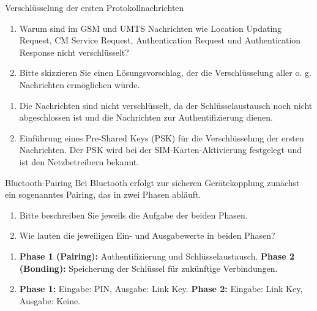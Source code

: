 \documentclass{article}
\begin{document}
\begin{exercise}{Verschlüsselung der ersten Protokollnachrichten}
  \begin{enumerate}
    \item Warum sind im GSM und UMTS Nachrichten wie Location Updating Request, CM Service Request, Authentication Request und Authentication Response nicht verschlüsselt?
    \item Bitte skizzieren Sie einen Lösungsvorschlag, der die Verschlüsselung aller o. g. Nachrichten ermöglichen würde.
  \end{enumerate}
 
   \begin{solution}
     \begin{enumerate}
      \item Die Nachrichten sind nicht verschlüsselt, da der Schlüsselaustausch noch nicht abgeschlossen ist und die Nachrichten zur Authentifizierung dienen.
      \item Einführung eines Pre-Shared Keys (PSK) für die Verschlüsselung der ersten Nachrichten. Der PSK wird bei der SIM-Karten-Aktivierung festgelegt und ist den Netzbetreibern bekannt.
     \end{enumerate}
   \end{solution}
 \end{exercise}
 


\setcounter{subsection}{90}
\begin{exercise}{Bluetooth-Pairing}
  Bei Bluetooth erfolgt zur sicheren Gerätekopplung zunächst ein sogenanntes Pairing, das in zwei Phasen abläuft.
  \begin{enumerate}
    \item Bitte beschreiben Sie jeweils die Aufgabe der beiden Phasen.
    \item Wie lauten die jeweiligen Ein- und Ausgabewerte in beiden Phasen?
  \end{enumerate}

  \begin{solution}
    \begin{enumerate}
      \item \textbf{Phase 1 (Pairing):} Authentifizierung und Schlüsselaustausch. \textbf{Phase 2 (Bonding):} Speicherung der Schlüssel für zukünftige Verbindungen.
      \item \textbf{Phase 1:} Eingabe: PIN, Ausgabe: Link Key. \textbf{Phase 2:} Eingabe: Link Key, Ausgabe: Keine.
    \end{enumerate}
  \end{solution}
\end{exercise}
\end{document}
